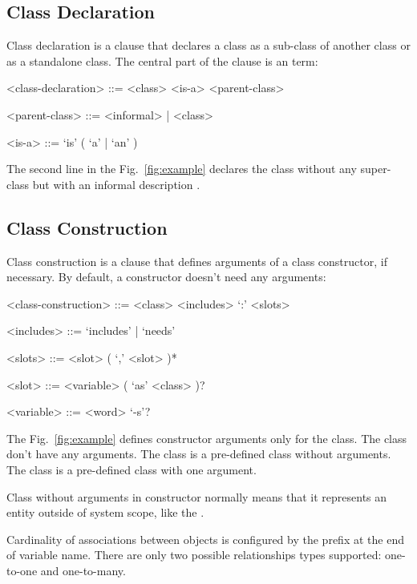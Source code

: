 \documentclass[sigplan,10pt,nonacm=true]{acmart}
\begin{document}
\subsection{Class Declaration}

Class declaration is a clause that declares a class as a sub-class of
another class or as a standalone class. The central part of the clause is
an  term:

\begin{grammar}
<class-declaration> ::= <class> <is-a> <parent-class>

<parent-class> ::= <informal> | <class>

<is-a> ::= `is' ( `a' | `an' )
\end{grammar}

The second line in the Fig.~\ref{fig:example} declares the class 
without any super-class but with an informal description
.

\subsection{Class Construction}

Class construction is a clause that defines arguments of a class
constructor, if necessary. By default, a constructor doesn't need any
arguments:

\begin{grammar}
<class-construction> ::= <class> <includes> `:' <slots>

<includes> ::= `includes' | `needs'

<slots> ::= <slot> ( `,' <slot> )*

<slot> ::= <variable> ( `as' <class> )?

<variable> ::= <word> `-s'?
\end{grammar}

The Fig.~\ref{fig:example} defines constructor arguments only for
the  class. The class  don't have any arguments. The class
 is a pre-defined class without arguments. The class  is a
pre-defined class with one argument.

Class without arguments in constructor normally means that it represents an
entity outside of system scope, like the .

Cardinality of associations between objects is configured by the 
prefix at the end of variable name. There are only
two possible relationships types supported: one-to-one and one-to-many.
\end{document}
